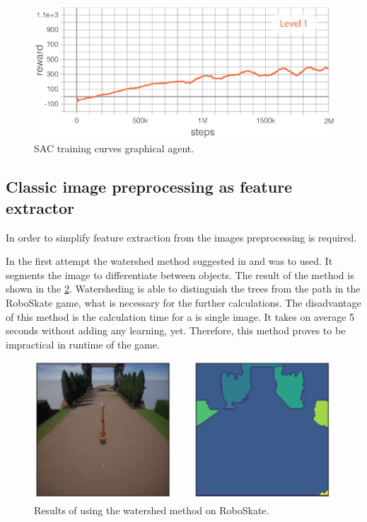 \documentclass[conference]{IEEEtran}
\begin{document}
\begin{figure}[!t]
\centering
\includegraphics[width = 1.0\linewidth]{images/Level_1_ep_rew_mean_VAE_segmentation.eps}
\caption{SAC training curves graphical agent.}
\label{fig:SAC01learningcurvVAEsegmentation}
\end{figure}

\subsection{Classic image preprocessing as feature extractor} \label{Classic_image_preprocessing_as_feature_extractor}
In order to simplify feature extraction from the images preprocessing is required.

In the first attempt the watershed method suggested in \cite{Watershed} and \cite{Watershed2} was to used. It segments the image to differentiate between objects. The result of the method is shown in the \figurename  \ref{fig:watershed}. Watersheding is able to distinguish the trees from the path in the RoboSkate game, what is necessary for the further calculations. The disadvantage of this method is the calculation time for a is single image. It takes on average 5 seconds without adding any learning, yet. Therefore, this method proves to be impractical in runtime of the game. 

\begin{figure}[!t]
\centering
\includegraphics[width = 1.0\linewidth]{images/Michelle_object_detection.png}
\caption{Results of using the watershed method on RoboSkate.}
\label{fig:watershed}
\end{figure}
\end{document}
